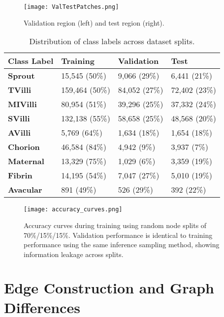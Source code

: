\documentclass{article}
\begin{document}
\begin{figure}[h]
  \centering
  \texttt{[image: ValTestPatches.png]}
  \caption{Validation region (left) and test region (right).}
\end{figure}

\begin{table}[h]
  \caption{Distribution of class labels across dataset splits.}
  \label{data-splits-table}
  \centering
  \begin{tabular}{llll}
    \toprule
    \textbf{Class Label} & \textbf{Training} & \textbf{Validation} & \textbf{Test}\\
    \midrule
    \textbf{Sprout} & 15,545 (50\%) & 9,066 (29\%) & 6,441 (21\%)\\
    \textbf{TVilli} & 159,464 (50\%) & 84,052 (27\%) & 72,402 (23\%)\\
    \textbf{MIVilli} & 80,954 (51\%) & 39,296 (25\%) & 37,332 (24\%)\\
    \textbf{SVilli} & 132,138 (55\%) & 58,658 (25\%) & 48,568 (20\%)\\
    \textbf{AVilli} & 5,769 (64\%) & 1,634 (18\%) & 1,654 (18\%)\\
    \textbf{Chorion} & 46,584 (84\%) & 4,942 (9\%) & 3,937 (7\%)\\
    \textbf{Maternal} & 13,329 (75\%) & 1,029 (6\%) & 3,359 (19\%)\\
    \textbf{Fibrin} & 14,195 (54\%) & 7,047 (27\%) & 5,010 (19\%)\\
    \textbf{Avacular} & 891 (49\%) & 526 (29\%) & 392 (22\%)\\
    \bottomrule
  \end{tabular}
\end{table}

\begin{figure}[h]
  \centering
  \texttt{[image: accuracy\_curves.png]}
  \caption{Accuracy curves during training using random node splits of 70\%/15\%/15\%. Validation performance is identical to training performance using the same inference sampling method, showing information leakage across splits.}
\end{figure}

\pagebreak
\section{Edge Construction and Graph Differences}
\label{edges}
\end{document}
